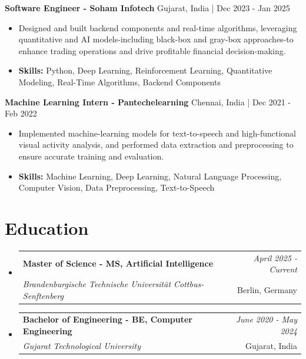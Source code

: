 \documentclass[a4paper,11pt]{article}
\makeatletter
\newcommand{\resumeSubheading}[4]{
\vspace{0.5mm}\item
    \begin{tabular*}{\linewidth}[t]{l@{\extracolsep{\fill}}r}
        \textbf{#1} & \textit{\footnotesize{#4}} \\
        \textit{\footnotesize{#3}} &  \footnotesize{#2}\\
    \end{tabular*}
    \vspace{-2.4mm}
}
\makeatother
\begin{document}
\vspace{1mm}
  \textbf{Software Engineer - Soham Infotech} \hfill Gujarat, India | Dec 2023 - Jan 2025
\vspace{-1.5mm} %
\begin{itemize}
  \item Designed and built backend components and real-time algorithms, leveraging quantitative and AI models-including black-box and gray-box approaches-to enhance trading operations and drive profitable financial decision-making.

\vspace{-2mm}
  \item \textbf{Skills:} Python, Deep Learning, Reinforcement Learning, Quantitative Modeling, Real-Time Algorithms, Backend Components
\end{itemize}

\vspace{1mm}
  \textbf{Machine Learning Intern - Pantechelearning} \hfill Chennai, India | Dec 2021 - Feb 2022
\vspace{-1.5mm} %
\begin{itemize}
  \item Implemented machine-learning models for text-to-speech and high-functional visual activity analysis, and performed data extraction and preprocessing to ensure accurate training and evaluation.
\vspace{-2mm}
  \item \textbf{Skills:} Machine Learning, Deep Learning, Natural Language Processing, Computer Vision, Data Preprocessing, Text-to-Speech
\end{itemize}\section{\textbf{Education}}
\vspace{-0.4mm}

\begin{itemize}[leftmargin=0.15in, label={}]
\resumeSubheading
{Master of Science - MS, Artificial Intelligence }{Berlin, Germany}
{Brandenburgische Technische Universität Cottbus-Senftenberg  }{April 2025 - Current}

\vspace{1.0mm} %
\resumeSubheading
{Bachelor of Engineering - BE, Computer Engineering  }{Gujarat, India}
{Gujarat Technological University }{June 2020 - May 2024}

\end{itemize}
\end{document}
